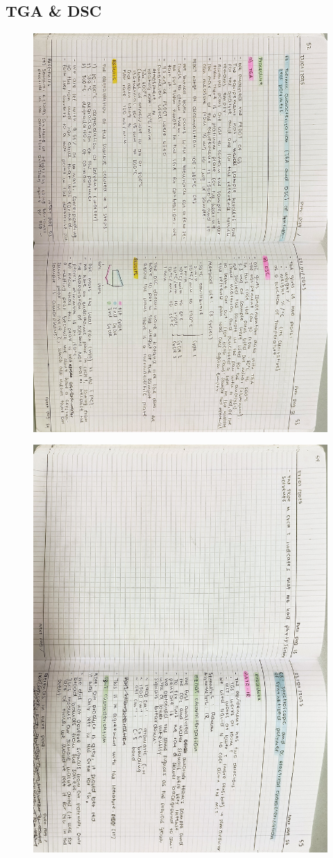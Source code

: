 \subsection{TGA \& DSC}
\begin{figure}[H]
	\centering
	\includegraphics[width=0.6\linewidth, angle=90]{../images/compressed/IMG20250123173147.jpg}
\end{figure}
\begin{figure}[H]
	\centering
	\includegraphics[width=0.6\linewidth, angle=90]{../images/compressed/IMG20250123173155.jpg}
\end{figure}



